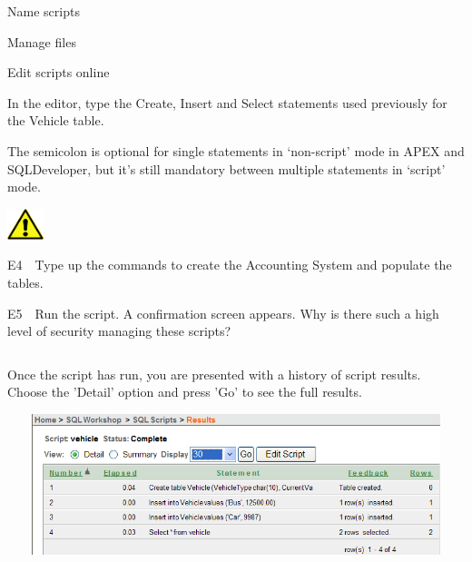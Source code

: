 \begin{center}
\begin{minipage}{3.133cm}
Name scripts
\end{minipage}
\end{center}


\begin{center}
\begin{minipage}{3.133cm}
Manage files
\end{minipage}
\end{center}


\begin{center}
\begin{minipage}{2.854cm}
Edit scripts online
\end{minipage}
\end{center}
In the editor, type the Create, Insert and Select statements used previously for the Vehicle table.

The semicolon is optional for single statements in `non-script' mode in APEX and SQLDeveloper, but it's still mandatory between multiple statements in `script' mode.

\begin{center}
  
\includegraphics[width=1.058cm,height=0.903cm]{images/img (2).png}

\end{center}
E4\ \ Type up the commands to create the Accounting System and populate the tables.

E5\ \ Run the script. A confirmation screen appears. Why is there such a high level of security managing these scripts? 

\begin{flushleft}
\tablefirsthead{}
\tablehead{}
\tabletail{}
\tablelasttail{}
\begin{supertabular}{|m{14.663cm}|}
\hline
\\\hline
\end{supertabular}
\end{flushleft}
Once the script has run, you are presented with a history of script results. Choose the 'Detail' option and press 'Go' to see the full results.

   
\includegraphics[width=14.748cm,height=4.094cm]{images/img (44).png}
 

